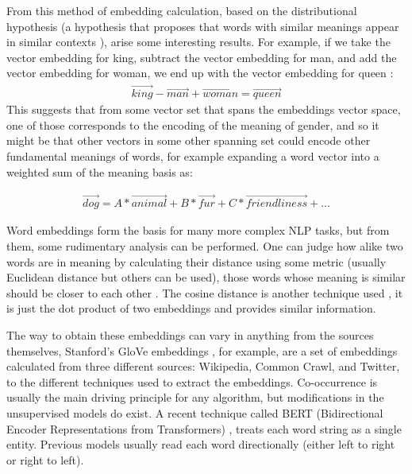 From this method of embedding calculation, based on the distributional hypothesis (a hypothesis that proposes that words with similar meanings appear in similar contexts \cite{lenci_distributional_2018}), arise some interesting results. For example, if we take the vector embedding for king, subtract the vector embedding for man, and add the vector embedding for woman, we end up with the vector embedding for queen \cite{mikolov_linguistic_2013}:
\begin{align*}
    \overrightarrow{king}-\overrightarrow{man}+\overrightarrow{woman}=\overrightarrow{queen}
\end{align*}
This suggests that from some vector set that spans the embeddings vector space, one of those corresponds to the encoding of the meaning of gender, and so it might be that other vectors in some other spanning set could encode other fundamental meanings of words, for example expanding a word vector into a weighted sum of the meaning basis as:

\begin{align}
    \overrightarrow{dog}=A*\overrightarrow{animal}+B*\overrightarrow{fur}+C*\overrightarrow{friendliness}+...
\end{align}

Word embeddings form the basis for many more complex NLP tasks, but from them, some rudimentary analysis can be performed. One can judge how alike two words are in meaning by calculating their distance using some metric (usually Euclidean distance but others can be used), those words whose meaning is similar should be closer to each other \cite{che_traversal-free_2017}. The cosine distance is another technique used \cite{mikolov_linguistic_2013}, it is just the dot product of two embeddings and provides similar information.

The way to obtain these embeddings can vary in anything from the sources themselves, Stanford's GloVe embeddings \cite{pennington_glove_2014}, for example, are a set of embeddings calculated from three different sources: Wikipedia, Common Crawl, and Twitter, to the different techniques used to extract the embeddings. Co-occurrence is usually the main driving principle for any algorithm, but modifications in the unsupervised models do exist. A recent technique called BERT (Bidirectional Encoder Representations from Transformers) \cite{devlin_bert_2019}, treats each word string as a single entity. Previous models usually read each word directionally (either left to right or right to left). 

